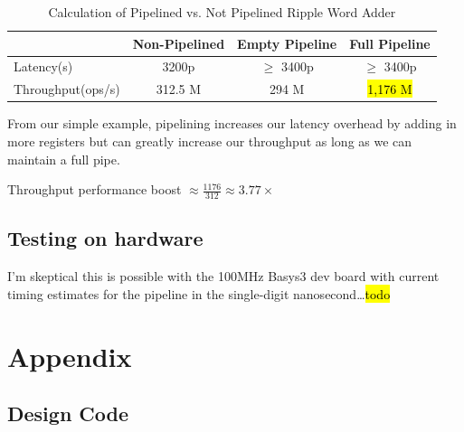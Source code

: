 \documentclass[a4paper]{report}
\begin{document}
			\begin{table}[H]
				\centering
				\begin{tabular}{l c c c}
					\toprule
					 & Non-Pipelined  & Empty Pipeline  & Full Pipeline  \\ 
					\midrule
					Latency(s) 			& 3200p		& $\ge$ 3400p	& $\ge$ 3400p\\
					\midrule
					Throughput(ops/s)	& 312.5 M	& 294 M			& \hl{1,176 M} \\
					\bottomrule
				\end{tabular}
				\caption{Calculation of Pipelined vs. Not Pipelined Ripple Word Adder}
				\label{tab:word}
			\end{table}

			From our simple example, pipelining increases our latency overhead
			by adding in more registers but can greatly increase our throughput
			as long as we can maintain a full pipe. 

			Throughput performance boost $\approx \frac{1176}{312} \approx 3.77 \times$
			
		\newpage
		\section{Testing on hardware}

			I'm skeptical this is possible with the 100MHz Basys3 dev board 
			with current timing estimates for the pipeline in the single-digit 
			nanosecond\ldots \hl{todo}
		
	\newpage
	\chapter{Appendix}

		\section{Design Code}

			

			


			
\end{document}
